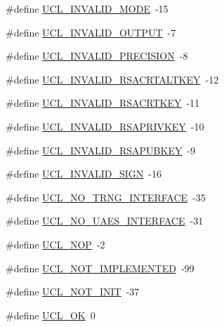 \begin{DoxyCompactItemize}
\item
\#define \hyperlink{group___u_c_l___r_e_t_u_r_n_ga41639862646f715bfb747cfe7398e705}{U\+C\+L\+\_\+\+I\+N\+V\+A\+L\+I\+D\+\_\+\+M\+O\+DE}~-\/15
\item
\#define \hyperlink{group___u_c_l___r_e_t_u_r_n_ga3ed78d658471831fff1612d8d0affb88}{U\+C\+L\+\_\+\+I\+N\+V\+A\+L\+I\+D\+\_\+\+O\+U\+T\+P\+UT}~-\/7
\item
\#define \hyperlink{group___u_c_l___r_e_t_u_r_n_ga479c5977db40ae908b259d1cce536799}{U\+C\+L\+\_\+\+I\+N\+V\+A\+L\+I\+D\+\_\+\+P\+R\+E\+C\+I\+S\+I\+ON}~-\/8
\item
\#define \hyperlink{group___u_c_l___r_e_t_u_r_n_ga3c5a146ccf18ee15393bb322f3e042f1}{U\+C\+L\+\_\+\+I\+N\+V\+A\+L\+I\+D\+\_\+\+R\+S\+A\+C\+R\+T\+A\+L\+T\+K\+EY}~-\/12
\item
\#define \hyperlink{group___u_c_l___r_e_t_u_r_n_ga5a8beb9fe66b842483769e5a6b6dc670}{U\+C\+L\+\_\+\+I\+N\+V\+A\+L\+I\+D\+\_\+\+R\+S\+A\+C\+R\+T\+K\+EY}~-\/11
\item
\#define \hyperlink{group___u_c_l___r_e_t_u_r_n_gae81f80c201b44b56e74b9598386addb5}{U\+C\+L\+\_\+\+I\+N\+V\+A\+L\+I\+D\+\_\+\+R\+S\+A\+P\+R\+I\+V\+K\+EY}~-\/10
\item
\#define \hyperlink{group___u_c_l___r_e_t_u_r_n_gaa1a3bbddfcb4ad0e43e1f6cf15cde9ab}{U\+C\+L\+\_\+\+I\+N\+V\+A\+L\+I\+D\+\_\+\+R\+S\+A\+P\+U\+B\+K\+EY}~-\/9
\item
\#define \hyperlink{group___u_c_l___r_e_t_u_r_n_gad3450e5a68b37eef1ce2d44e36d390b5}{U\+C\+L\+\_\+\+I\+N\+V\+A\+L\+I\+D\+\_\+\+S\+I\+GN}~-\/16
\item
\#define \hyperlink{group___u_c_l___r_e_t_u_r_n_ga668c018da9085eb011e87324b5c544bd}{U\+C\+L\+\_\+\+N\+O\+\_\+\+T\+R\+N\+G\+\_\+\+I\+N\+T\+E\+R\+F\+A\+CE}~-\/35
\item
\#define \hyperlink{group___u_c_l___r_e_t_u_r_n_ga53588dab763f3da734c38514d2936f1d}{U\+C\+L\+\_\+\+N\+O\+\_\+\+U\+A\+E\+S\+\_\+\+I\+N\+T\+E\+R\+F\+A\+CE}~-\/31
\item
\#define \hyperlink{group___u_c_l___r_e_t_u_r_n_ga6ffb73da20c781dcb7f3004102c93aec}{U\+C\+L\+\_\+\+N\+OP}~-\/2
\item
\#define \hyperlink{group___u_c_l___r_e_t_u_r_n_ga9a88a169ed70729e2b529a2ddfdad426}{U\+C\+L\+\_\+\+N\+O\+T\+\_\+\+I\+M\+P\+L\+E\+M\+E\+N\+T\+ED}~-\/99
\item
\#define \hyperlink{group___u_c_l___r_e_t_u_r_n_ga8a9136da1288e350a5ec6eed18678631}{U\+C\+L\+\_\+\+N\+O\+T\+\_\+\+I\+N\+IT}~-\/37
\item
\#define \hyperlink{group___u_c_l___r_e_t_u_r_n_gaf4aeb5212f5aa1b3a12b3dea7eb1785d}{U\+C\+L\+\_\+\+OK}~0

\end{DoxyCompactItemize}
